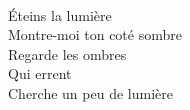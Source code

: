 \\
Éteins la lumière \\
Montre-moi ton coté sombre \\
Regarde les ombres \\
Qui errent \\
Cherche un peu de lumière \\
